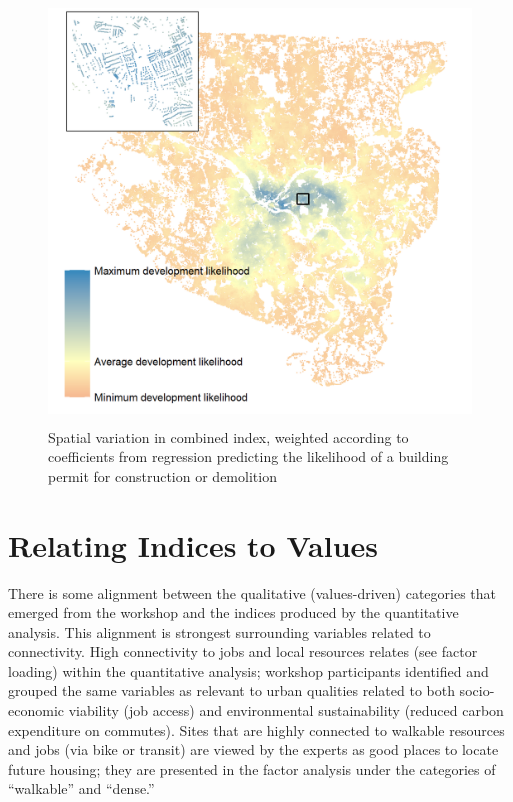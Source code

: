 \documentclass[
]{book}
\begin{document}
\begin{figure}
\includegraphics[width=1\linewidth]{04_figures/combined} \caption{Spatial variation in combined index, weighted according to coefficients from regression predicting the likelihood of a building permit for construction or demolition}\label{fig:combined-map}
\end{figure}

\hypertarget{relating-indices-to-values}{%
\chapter{Relating Indices to Values}\label{relating-indices-to-values}}

There is some alignment between the qualitative (values-driven) categories that emerged from the workshop and the indices produced by the quantitative analysis. This alignment is strongest surrounding variables related to connectivity. High connectivity to jobs and local resources relates (see factor loading) within the quantitative analysis; workshop participants identified and grouped the same variables as relevant to urban qualities related to both socio-economic viability (job access) and environmental sustainability (reduced carbon expenditure on commutes). Sites that are highly connected to walkable resources and jobs (via bike or transit) are viewed by the experts as good places to locate future housing; they are presented in the factor analysis under the categories of ``walkable'' and ``dense.''
\end{document}
